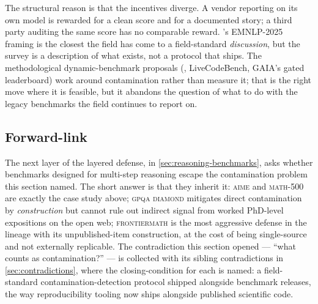 The structural reason is that the incentives diverge. A vendor
reporting on its own model is rewarded for a clean score and for a
documented  story; a third party auditing the same
score has no comparable reward. \citet{contamination-survey-2025}'s
EMNLP-2025 framing is the closest the field has come to a
field-standard \emph{discussion}, but the survey is a description of
what exists, not a protocol that ships. The methodological
dynamic-benchmark proposals (, LiveCodeBench, GAIA's gated
leaderboard) work around contamination rather than measure it; that
is the right move where it is feasible, but it abandons the question
of what to do with the legacy benchmarks the field continues to
report on.

\subsection{Forward-link}
\label{sec:contamination-forward}

The next layer of the layered defense, in
\cref{sec:reasoning-benchmarks}, asks whether benchmarks designed for
multi-step reasoning escape the contamination problem this section
named. The short answer is that they inherit it: \textsc{aime} and
\textsc{math-500} are exactly the case study above; \textsc{gpqa
diamond} \citep{rein2023-gpqa} mitigates direct contamination by
\emph{construction} but cannot rule out indirect signal from worked
PhD-level expositions on the open web; \textsc{frontiermath}
\citep{glazer2024-frontiermath} is the most aggressive defense in the
lineage with its unpublished-item construction, at the cost of being
single-source and not externally replicable. The contradiction this
section opened --- ``what counts as contamination?'' --- is
collected with its sibling contradictions in
\cref{sec:contradictions}, where the closing-condition for each is
named: a field-standard contamination-detection protocol shipped
alongside benchmark releases, the way reproducibility tooling now
ships alongside published scientific code.
